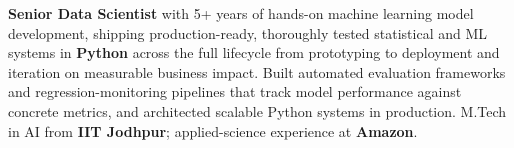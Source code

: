\documentclass[letter,10pt]{article}
\begin{document}

\textbf{Senior Data Scientist} with 5+ years of hands-on machine learning model development, shipping production-ready, thoroughly tested statistical and ML systems in \textbf{Python} across the full lifecycle from prototyping to deployment and iteration on measurable business impact.
Built automated evaluation frameworks and regression-monitoring pipelines that track model performance against concrete metrics, and architected scalable Python systems in production.
M.Tech in AI from \textbf{IIT Jodhpur}; applied-science experience at \textbf{Amazon}.
\end{document}
